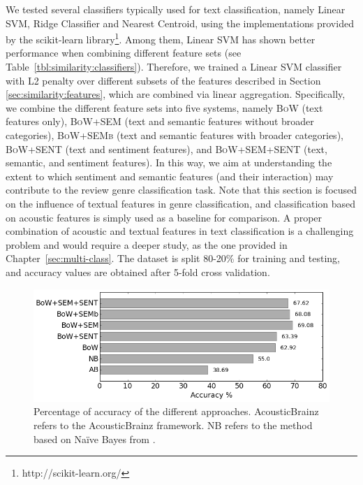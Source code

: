We tested several classifiers typically used for text classification, namely Linear SVM, Ridge Classifier and Nearest Centroid, using the implementations provided by the scikit-learn library\footnote{http://scikit-learn.org/}. Among them, Linear SVM has shown better performance when combining different feature sets (see Table~\ref{tbl:similarity:classifiers}). Therefore, we trained a Linear SVM classifier with L2 penalty over different subsets of the features described in Section \ref{sec:similarity:features}, which are combined via linear aggregation. Specifically, we combine the different feature sets into five systems, namely \textsc{BoW} (text features only), \textsc{BoW+SEM} (text and semantic features without broader categories), \textsc{BoW+SEMb} (text and semantic features with broader categories), \textsc{BoW+SENT} (text and sentiment features), and \textsc{BoW+SEM+SENT} (text, semantic, and sentiment features). In this way, we aim at understanding the extent to which sentiment and semantic features (and their interaction) may contribute to the review genre classification task. Note that this section is focused on the influence of textual features in genre classification, and classification based on acoustic features is simply used as a baseline for comparison. A proper combination of acoustic and textual features in text classification is a challenging problem and would require a deeper study, as the one provided in Chapter~\ref{sec:multi-class}.
The dataset is split 80-20\% for training and testing, and accuracy values are obtained after 5-fold cross validation. 

\begin{figure}
    \centering
    \includegraphics[width=0.7\columnwidth]{ch06_similarity_pics/results2_bn.png}
    \caption[Percentage of accuracy of the different approaches.]{Percentage of accuracy of the different approaches. AcousticBrainz refers to the AcousticBrainz framework. NB refers to the method based on Na\"{i}ve Bayes from \cite{Hu2005}.}
    \label{fig:similarity:results}
\end{figure}

